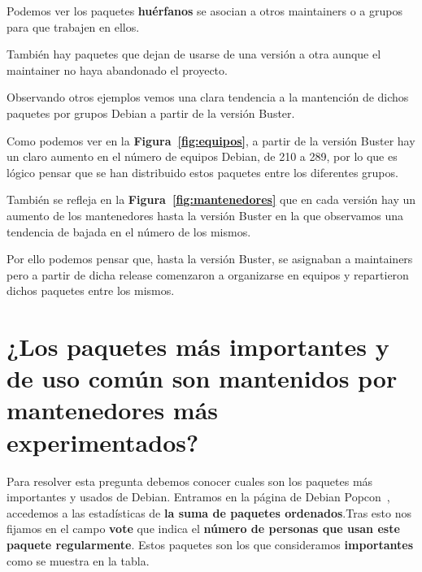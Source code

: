 \documentclass[a4paper, 12pt]{book}
\begin{document}
Podemos ver los paquetes \textbf{huérfanos} se asocian a otros maintainers o a grupos para que trabajen en ellos. 

También hay paquetes que dejan de usarse de una versión a otra aunque el maintainer no haya abandonado el proyecto.

Observando otros ejemplos vemos una clara tendencia a la mantención de dichos paquetes por grupos Debian a partir de la versión Buster.

Como podemos ver en la \textbf{Figura~\ref{fig:equipos}}, a partir de la versión Buster hay un claro aumento en el número de equipos Debian, de 210 a 289, por lo que es lógico pensar que se han distribuido estos paquetes entre los diferentes grupos.

También se refleja en la \textbf{Figura~\ref{fig:mantenedores}} que en cada versión hay un aumento de los mantenedores hasta la versión Buster en la que observamos una tendencia de bajada en el número de los mismos.

Por ello podemos pensar que, hasta la versión Buster, se asignaban a maintainers pero a partir de dicha release comenzaron a organizarse en equipos y repartieron dichos paquetes entre los mismos.


\section{¿Los paquetes más importantes y de uso común son mantenidos por mantenedores más experimentados?}
\label{sec:pregunta_6}

Para resolver esta pregunta debemos conocer cuales son los paquetes más importantes y usados de Debian. Entramos en la página de Debian Popcon~\cite{debian:_popcon}, accedemos a las estadísticas de \textbf{la suma de paquetes ordenados}.Tras esto nos fijamos en el campo \textbf{vote} que indica el \textbf{número de personas que usan este paquete regularmente}. Estos paquetes son los que consideramos \textbf{importantes} como se muestra en la tabla.
\end{document}
